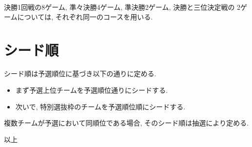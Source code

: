\documentclass[11pt]{jarticle}
\begin{document}
決勝1回戦の8ゲーム, 準々決勝4ゲーム, 準決勝2ゲーム, 決勝と三位決定戦の
2ゲームについては, それぞれ同一のコースを用いる.

\section{シード順}
シード順は予選順位に基づき以下の通りに定める.
\begin{itemize}
\item
まず予選上位チームを予選順位通りにシードする.
\item
次いで, 特別選抜枠のチームを予選順位順にシードする.
\end{itemize}
複数チームが予選において同順位である場合, そのシード順は抽選により定める.

\begin{flushright}
以上
\end{flushright}
\end{document}
